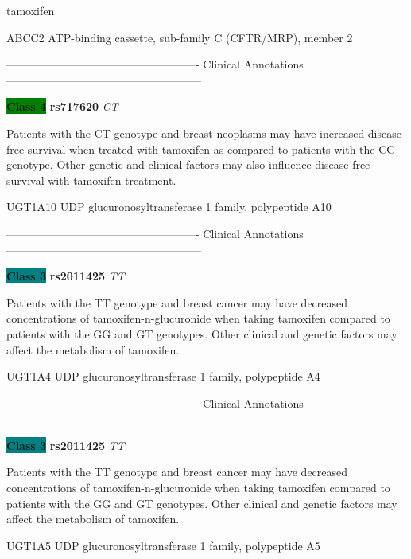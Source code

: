 \documentclass{resume} %
\begin{document}
\begin{rSection}{ tamoxifen }
\begin{rSubsection}{ ABCC2 }{ ATP-binding cassette, sub-family C (CFTR/MRP), member 2 }{}{}
\item[] ---------------------------------------------------- Clinical Annotations -----------------------------------------------------\newline
\item \textbf{\colorbox{green} {Class 4}} \textbf{ rs717620 } \textit{ CT }
\item[] Patients with the CT genotype and breast neoplasms may have increased disease-free survival when treated with tamoxifen as compared to patients with the CC genotype. Other genetic and clinical factors may also influence disease-free survival with tamoxifen treatment.
\end{rSubsection}\begin{rSubsection}{ UGT1A10 }{ UDP glucuronosyltransferase 1 family, polypeptide A10 }{}{}
\item[]

\item[] ---------------------------------------------------- Clinical Annotations -----------------------------------------------------\newline
\item \textbf{\colorbox{teal} {Class 3}} \textbf{ rs2011425 } \textit{ TT }
\item[] Patients with the TT genotype and breast cancer may have decreased concentrations of tamoxifen-n-glucuronide when taking tamoxifen compared to patients with the GG and GT genotypes. Other clinical and genetic factors may affect the metabolism of tamoxifen.
\end{rSubsection}\begin{rSubsection}{ UGT1A4 }{ UDP glucuronosyltransferase 1 family, polypeptide A4 }{}{}
\item[]

\item[] ---------------------------------------------------- Clinical Annotations -----------------------------------------------------\newline
\item \textbf{\colorbox{teal} {Class 3}} \textbf{ rs2011425 } \textit{ TT }
\item[] Patients with the TT genotype and breast cancer may have decreased concentrations of tamoxifen-n-glucuronide when taking tamoxifen compared to patients with the GG and GT genotypes. Other clinical and genetic factors may affect the metabolism of tamoxifen.
\end{rSubsection}\begin{rSubsection}{ UGT1A5 }{ UDP glucuronosyltransferase 1 family, polypeptide A5 }{}{}
\item[]


\end{rSubsection}
\end{rSection}
\end{document}
